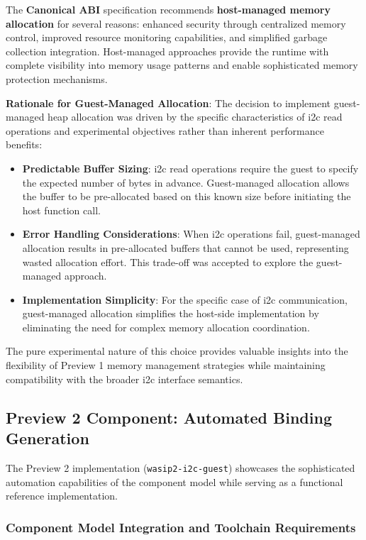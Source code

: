 The \textbf{Canonical ABI} specification recommends \textbf{host-managed memory allocation} for several reasons: enhanced security through centralized memory control, improved resource monitoring capabilities, and simplified garbage collection integration. Host-managed approaches provide the runtime with complete visibility into memory usage patterns and enable sophisticated memory protection mechanisms.

\textbf{Rationale for Guest-Managed Allocation}: The decision to implement guest-managed heap allocation was driven by the specific characteristics of \acrshort{i2c} read operations and experimental objectives rather than inherent performance benefits:

\begin{itemize}
    \item \textbf{Predictable Buffer Sizing}: \acrshort{i2c} read operations require the guest to specify the expected number of bytes in advance. Guest-managed allocation allows the buffer to be pre-allocated based on this known size before initiating the host function call.
    \item \textbf{Error Handling Considerations}: When \acrshort{i2c} operations fail, guest-managed allocation results in pre-allocated buffers that cannot be used, representing wasted allocation effort. This trade-off was accepted to explore the guest-managed approach.
    \item \textbf{Implementation Simplicity}: For the specific case of \acrshort{i2c} communication, guest-managed allocation simplifies the host-side implementation by eliminating the need for complex memory allocation coordination.
\end{itemize}

The pure experimental nature of this choice provides valuable insights into the flexibility of Preview 1 memory management strategies while maintaining compatibility with the broader \acrshort{i2c} interface semantics.

\subsection{Preview 2 Component: Automated Binding Generation}

The Preview 2 implementation (\texttt{wasip2-i2c-guest}) showcases the sophisticated automation capabilities of the component model while serving as a functional reference implementation.

\subsubsection{Component Model Integration and Toolchain Requirements}

